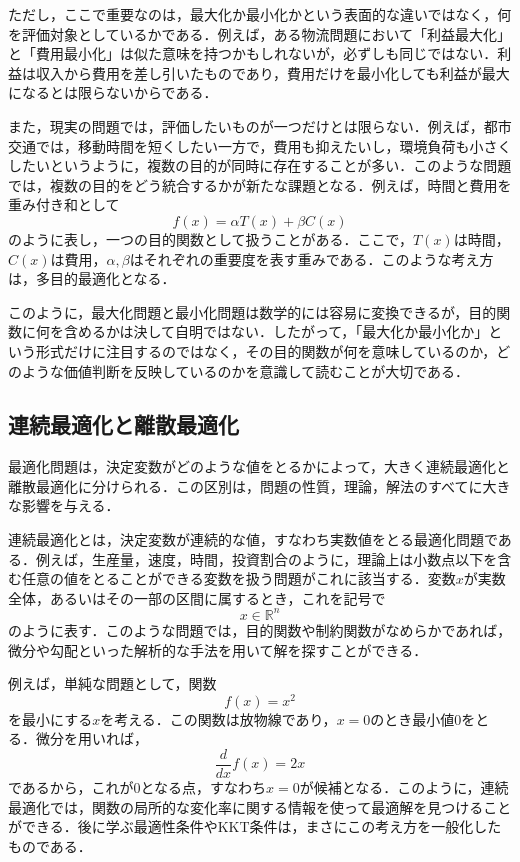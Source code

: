ただし，ここで重要なのは，最大化か最小化かという表面的な違いではなく，何を評価対象としているかである．例えば，ある物流問題において「利益最大化」と「費用最小化」は似た意味を持つかもしれないが，必ずしも同じではない．利益は収入から費用を差し引いたものであり，費用だけを最小化しても利益が最大になるとは限らないからである．

また，現実の問題では，評価したいものが一つだけとは限らない．例えば，都市交通では，移動時間を短くしたい一方で，費用も抑えたいし，環境負荷も小さくしたいというように，複数の目的が同時に存在することが多い．このような問題では，複数の目的をどう統合するかが新たな課題となる．例えば，時間と費用を重み付き和として
\begin{equation}
f(x)=\alpha T(x)+\beta C(x)
\end{equation}
のように表し，一つの目的関数として扱うことがある．ここで，$T(x)$は時間，$C(x)$は費用，$\alpha ,\beta $はそれぞれの重要度を表す重みである．このような考え方は，多目的最適化となる．

このように，最大化問題と最小化問題は数学的には容易に変換できるが，目的関数に何を含めるかは決して自明ではない．したがって，「最大化か最小化か」という形式だけに注目するのではなく，その目的関数が何を意味しているのか，どのような価値判断を反映しているのかを意識して読むことが大切である．

\subsection{連続最適化と離散最適化}

最適化問題は，決定変数がどのような値をとるかによって，大きく連続最適化と離散最適化に分けられる．この区別は，問題の性質，理論，解法のすべてに大きな影響を与える．

連続最適化とは，決定変数が連続的な値，すなわち実数値をとる最適化問題である．例えば，生産量，速度，時間，投資割合のように，理論上は小数点以下を含む任意の値をとることができる変数を扱う問題がこれに該当する．変数$x$が実数全体，あるいはその一部の区間に属するとき，これを記号で
\begin{equation}
x\in \mathbb{R}^n
\end{equation}
のように表す．このような問題では，目的関数や制約関数がなめらかであれば，微分や勾配といった解析的な手法を用いて解を探すことができる．

例えば，単純な問題として，関数
\begin{equation}
f(x)=x^2
\end{equation}
を最小にする$x$を考える．この関数は放物線であり，$x=0$のとき最小値$0$をとる．微分を用いれば，
\begin{equation}
\frac{d}{dx}f(x)=2x
\end{equation}
であるから，これが$0$となる点，すなわち$x=0$が候補となる．このように，連続最適化では，関数の局所的な変化率に関する情報を使って最適解を見つけることができる．後に学ぶ最適性条件やKKT条件は，まさにこの考え方を一般化したものである．

